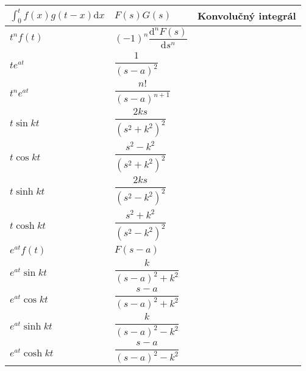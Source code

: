 \documentclass[a4paper, 10pt, ]{article}
\begin{document}
\begin{longtable}[l]{p{3.7cm} @{} p{5.9cm} p{2.8cm}}
    $\displaystyle{\int_0^t f(x)g(t-x) \text{d}x}$ & $F(s)G(s)$                     & {\color{Gray} \scriptsize Konvolučný integrál} \\[4mm]
    \midrule \addlinespace[4mm]


    $t^nf(t)$                               & $(-1)^n\dfrac{\text{d}^n F(s)}{\text{d} s^n}$ \\[4mm]
    $te^{at}$                               & $\dfrac{1}{(s-a)^2}$                  \\[4mm]
    $t^ne^{at}$                             & $\dfrac{n!}{(s-a)^{n+1}}$             \\[4mm]
    $t\sin kt$                              & $\dfrac{2ks}{(s^2+k^2)^2}$            \\[4mm]
    $t\cos kt$                              & $\dfrac{s^2-k^2}{(s^2+k^2)^2}$        \\[4mm]
    $t\sinh kt$                             & $\dfrac{2ks}{(s^2-k^2)^2}$            \\[4mm]
    $t\cosh kt$                             & $\dfrac{s^2+k^2}{(s^2-k^2)^2}$        \\[4mm]
    \midrule \addlinespace[4mm]

    
    $e^{at}f(t)$                            & $F(s-a)$                              \\[4mm]
    $e^{at}\sin kt$                         & $\dfrac{k}{(s-a)^2+k^2}$              \\[4mm]
    $e^{at}\cos kt$                         & $\dfrac{s-a}{(s-a)^2+k^2}$            \\[4mm]
    $e^{at}\sinh kt$                        & $\dfrac{k}{(s-a)^2-k^2}$              \\[4mm]
    $e^{at}\cosh kt$                        & $\dfrac{s-a}{(s-a)^2-k^2}$            \\[4mm]



    \bottomrule

\end{longtable}
\end{document}
